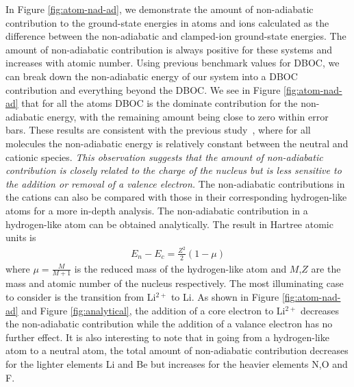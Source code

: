 \documentclass[pra,superscriptaddress,groupedaddress,twocolumn]{revtex4}
\begin{document}
In Figure \ref{fig:atom-nad-ad}, we demonstrate the amount of non-adiabatic contribution to the ground-state energies in atoms and ions calculated as the difference between the non-adiabatic and clamped-ion ground-state energies. The amount of non-adiabatic contribution is always positive for these systems and increases with atomic number. Using previous benchmark values for DBOC, we can break down the non-adiabatic energy of our system into a DBOC contribution and everything beyond the DBOC. We see in Figure \ref{fig:atom-nad-ad} that for all the atoms DBOC is the dominate contribution for the non-adiabatic energy, with the remaining amount being close to zero within error bars. These results are consistent with the previous study~\cite{Klopper_IP}, where for all molecules the non-adiabatic energy is relatively constant between the neutral and cationic species. \textit{This observation suggests that the amount of non-adiabatic contribution is closely related to the charge of the nucleus but is less sensitive to the addition or removal of a valence electron.} The non-adiabatic contributions in the cations can also be compared with those in their corresponding hydrogen-like atoms for a more in-depth analysis. The non-adiabatic contribution in a hydrogen-like atom can be obtained analytically. The result in Hartree atomic units is
\begin{align}
E_n-E_c=\frac{Z^2}{2}(1-\mu)
\end{align}
where $\mu=\frac{M}{M+1}$ is the reduced mass of the hydrogen-like atom and $M$,$Z$ are the mass and atomic number of the nucleus respectively. The most illuminating case to consider is the transition from Li$^{2+}$ to Li. As shown in Figure \ref{fig:atom-nad-ad} and Figure \ref{fig:analytical}, the addition of a core electron to Li$^{2+}$ decreases the non-adiabatic contribution while the addition of a valance electron has no further effect. It is also interesting to note that in going from a hydrogen-like atom to a neutral atom, the total amount of non-adiabatic contribution decreases for the lighter elements Li and Be but increases for the heavier elements N,O and F.

\end{document}
